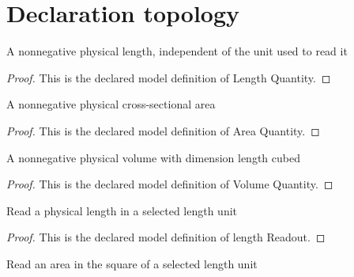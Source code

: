 \section{Declaration topology}
\begin{definition}
  \label{def:physics:phyx-mini-0359:phyxminiproblems-problemphyxmini0359-lengthquantity}
  A nonnegative physical length, independent of the unit used to read it
\end{definition}
\begin{proof}
  This is the declared model definition of Length Quantity.
\end{proof}
\begin{definition}
  \label{def:physics:phyx-mini-0359:phyxminiproblems-problemphyxmini0359-areaquantity}
  A nonnegative physical cross-sectional area
\end{definition}
\begin{proof}
  This is the declared model definition of Area Quantity.
\end{proof}
\begin{definition}
  \label{def:physics:phyx-mini-0359:phyxminiproblems-problemphyxmini0359-volumequantity}
  A nonnegative physical volume with dimension length cubed
\end{definition}
\begin{proof}
  This is the declared model definition of Volume Quantity.
\end{proof}
\begin{definition}
  \label{def:physics:phyx-mini-0359:phyxminiproblems-problemphyxmini0359-lengthreadout}
  Read a physical length in a selected length unit
\end{definition}
\begin{proof}
  This is the declared model definition of length Readout.
\end{proof}
\begin{definition}
  \label{def:physics:phyx-mini-0359:phyxminiproblems-problemphyxmini0359-areareadout}
  Read an area in the square of a selected length unit
\end{definition}
